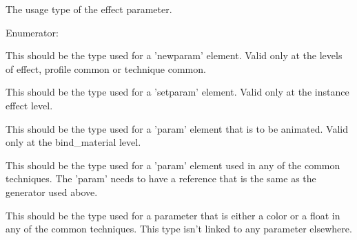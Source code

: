 The usage type of the effect parameter. \begin{Desc}
\item[Enumerator: ]\par
\begin{description}
\item[{\em 
\hypertarget{classFCDEffectParameter_a25a513057c610179b5229dc99e840bb9a14eca93fcd14630310f36b886eccb457}{
GENERATOR}
\label{classFCDEffectParameter_a25a513057c610179b5229dc99e840bb9a14eca93fcd14630310f36b886eccb457}
}]This should be the type used for a 'newparam' element. Valid only at the levels of effect, profile common or technique common. \item[{\em 
\hypertarget{classFCDEffectParameter_a25a513057c610179b5229dc99e840bb9a39a1f8b4018e17cf450cdf1d4b1ff73a}{
MODIFIER}
\label{classFCDEffectParameter_a25a513057c610179b5229dc99e840bb9a39a1f8b4018e17cf450cdf1d4b1ff73a}
}]This should be the type used for a 'setparam' element. Valid only at the instance effect level. \item[{\em 
\hypertarget{classFCDEffectParameter_a25a513057c610179b5229dc99e840bb9a9bc6e04cd6ea9ab90d07f215aeff3b60}{
ANIMATOR}
\label{classFCDEffectParameter_a25a513057c610179b5229dc99e840bb9a9bc6e04cd6ea9ab90d07f215aeff3b60}
}]This should be the type used for a 'param' element that is to be animated. Valid only at the bind\_\-material level. \item[{\em 
\hypertarget{classFCDEffectParameter_a25a513057c610179b5229dc99e840bb9a170fdf70dc1ace376fbe736c84bf8d0c}{
REFERENCER}
\label{classFCDEffectParameter_a25a513057c610179b5229dc99e840bb9a170fdf70dc1ace376fbe736c84bf8d0c}
}]This should be the type used for a 'param' element used in any of the common techniques. The 'param' needs to have a reference that is the same as the generator used above. \item[{\em 
\hypertarget{classFCDEffectParameter_a25a513057c610179b5229dc99e840bb9abb34bd1f49cb5c89dee19319a990c094}{
CONSTANT}
\label{classFCDEffectParameter_a25a513057c610179b5229dc99e840bb9abb34bd1f49cb5c89dee19319a990c094}
}]This should be the type used for a parameter that is either a color or a float in any of the common techniques. This type isn't linked to any parameter elsewhere. \end{description}
\end{Desc}

